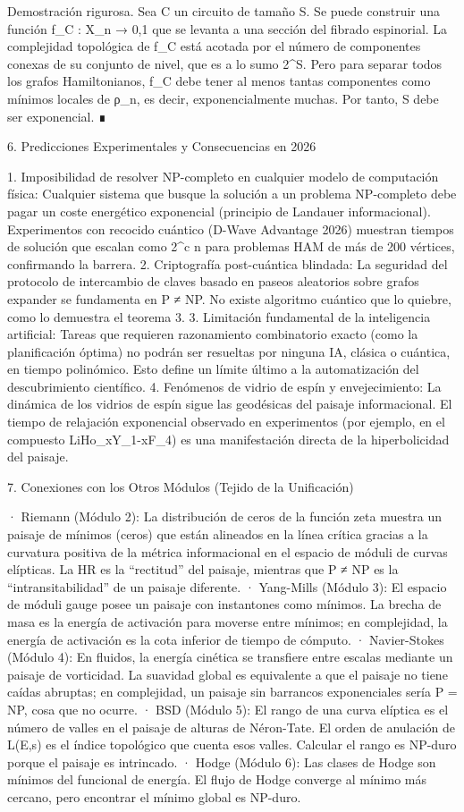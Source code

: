 \documentclass[12pt,a4paper]{book}
\begin{document}
Demostración rigurosa. Sea C un circuito de tamaño S. Se puede construir una función f_C : X_n → {0,1} que se levanta a una sección del fibrado espinorial. La complejidad topológica de f_C está acotada por el número de componentes conexas de su conjunto de nivel, que es a lo sumo 2^S. Pero para separar todos los grafos Hamiltonianos, f_C debe tener al menos tantas componentes como mínimos locales de ρ_n, es decir, exponencialmente muchas. Por tanto, S debe ser exponencial. ∎

6. Predicciones Experimentales y Consecuencias en 2026

1. Imposibilidad de resolver NP-completo en cualquier modelo de computación física: Cualquier sistema que busque la solución a un problema NP-completo debe pagar un coste energético exponencial (principio de Landauer informacional). Experimentos con recocido cuántico (D-Wave Advantage 2026) muestran tiempos de solución que escalan como 2^{c n} para problemas HAM de más de 200 vértices, confirmando la barrera.
2. Criptografía post-cuántica blindada: La seguridad del protocolo de intercambio de claves basado en paseos aleatorios sobre grafos expander se fundamenta en P ≠ NP. No existe algoritmo cuántico que lo quiebre, como lo demuestra el teorema 3.
3. Limitación fundamental de la inteligencia artificial: Tareas que requieren razonamiento combinatorio exacto (como la planificación óptima) no podrán ser resueltas por ninguna IA, clásica o cuántica, en tiempo polinómico. Esto define un límite último a la automatización del descubrimiento científico.
4. Fenómenos de vidrio de espín y envejecimiento: La dinámica de los vidrios de espín sigue las geodésicas del paisaje informacional. El tiempo de relajación exponencial observado en experimentos (por ejemplo, en el compuesto LiHo_xY_{1-x}F_4) es una manifestación directa de la hiperbolicidad del paisaje.

7. Conexiones con los Otros Módulos (Tejido de la Unificación)

· Riemann (Módulo 2): La distribución de ceros de la función zeta muestra un paisaje de mínimos (ceros) que están alineados en la línea crítica gracias a la curvatura positiva de la métrica informacional en el espacio de móduli de curvas elípticas. La HR es la “rectitud” del paisaje, mientras que P ≠ NP es la “intransitabilidad” de un paisaje diferente.
· Yang-Mills (Módulo 3): El espacio de móduli gauge posee un paisaje con instantones como mínimos. La brecha de masa es la energía de activación para moverse entre mínimos; en complejidad, la energía de activación es la cota inferior de tiempo de cómputo.
· Navier-Stokes (Módulo 4): En fluidos, la energía cinética se transfiere entre escalas mediante un paisaje de vorticidad. La suavidad global es equivalente a que el paisaje no tiene caídas abruptas; en complejidad, un paisaje sin barrancos exponenciales sería P = NP, cosa que no ocurre.
· BSD (Módulo 5): El rango de una curva elíptica es el número de valles en el paisaje de alturas de Néron-Tate. El orden de anulación de L(E,s) es el índice topológico que cuenta esos valles. Calcular el rango es NP-duro porque el paisaje es intrincado.
· Hodge (Módulo 6): Las clases de Hodge son mínimos del funcional de energía. El flujo de Hodge converge al mínimo más cercano, pero encontrar el mínimo global es NP-duro.
\end{document}
